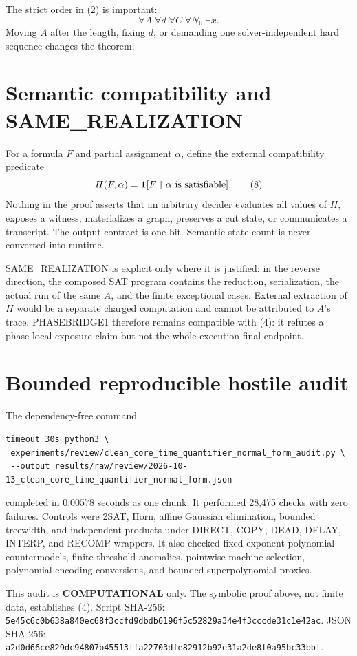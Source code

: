 \documentclass[11pt]{article}
\newcommand{\COMP}{\textbf{COMPUTATIONAL}}
\begin{document}
The strict order in (2) is important:
\[
 \forall A\;\forall d\;\forall C\;\forall N_0\;\exists x.
\]
Moving \(A\) after the length, fixing \(d\), or demanding one solver-independent
hard sequence changes the theorem.

\section{Semantic compatibility and SAME\_REALIZATION}

For a formula \(F\) and partial assignment \(\alpha\), define the external
compatibility predicate
\[
 H(F,\alpha)={\bf 1}[F\upharpoonright\alpha\text{ is satisfiable}]. \tag{8}
\]
Nothing in the proof asserts that an arbitrary decider evaluates all values
of \(H\), exposes a witness, materializes a graph, preserves a cut state, or
communicates a transcript.  The output contract is one bit.  Semantic-state
count is never converted into runtime.

SAME\_REALIZATION is explicit only where it is justified: in the reverse
direction, the composed SAT program contains the reduction, serialization,
the actual run of the same \(A\), and the finite exceptional cases.  External
extraction of \(H\) would be a separate charged computation and cannot be
attributed to \(A\)'s trace.  PHASEBRIDGE1 therefore remains compatible with
(4): it refutes a phase-local exposure claim but not the whole-execution final
endpoint.

\section{Bounded reproducible hostile audit}

The dependency-free command
\begin{verbatim}
timeout 30s python3 \
 experiments/review/clean_core_time_quantifier_normal_form_audit.py \
 --output results/raw/review/2026-10-13_clean_core_time_quantifier_normal_form.json
\end{verbatim}
completed in \(0.00578\) seconds as one chunk.  It performed 28,475 checks
with zero failures.  Controls were 2SAT, Horn, affine Gaussian elimination,
bounded treewidth, and independent products under DIRECT, COPY, DEAD, DELAY,
INTERP, and RECOMP wrappers.  It also checked fixed-exponent polynomial
countermodels, finite-threshold anomalies, pointwise machine selection,
polynomial encoding conversions, and bounded superpolynomial proxies.

This audit is \COMP{} only.  The symbolic proof above, not finite data,
establishes (4).  Script SHA-256:
\nolinkurl{5e45c6c0b638a840ec68f3ccfd9dbdb6196f5c52829a34e4f3cccde31c1e42ac}.
JSON SHA-256:
\nolinkurl{a2d0d66ce829dc94807b45513ffa22703dfe82912b92e31a2de8f0a95bc33bbf}.
\end{document}
